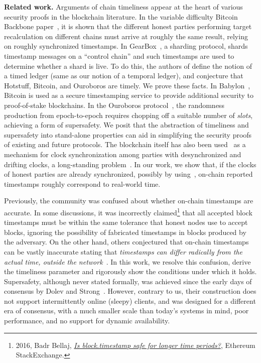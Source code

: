 \noindent
\textbf{Related work.}
Arguments of chain timeliness appear at the heart of various security proofs
in the blockchain literature.
In the variable difficulty Bitcoin Backbone paper~\cite{varbackbone},
it is shown that the different honest parties performing target recalculation on different chains
must arrive at roughly the same result, relying on roughly synchronized timestamps.
In GearBox~\cite{gearbox}, a sharding protocol, shards timestamp messages on a ``control chain'' and such timestamps are used to determine whether a shard is live.
To do this, the authors of \cite{gearbox} define the notion of a timed ledger (same as our notion of a temporal ledger), and conjecture that Hotstuff, Bitcoin, and Ouroboros are timely. We prove these facts.
In Babylon~\cite{babylon}, Bitcoin is used as a secure timestamping service to provide additional security to proof-of-stake blockchains.
In the Ouroboros protocol~\cite{ouroboros},
the randomness production from epoch-to-epoch requires chopping off a suitable number of \emph{slots},
achieving a form of supersafety.
We posit that the abstraction of timeliness and supersafety
into stand-alone properties can aid in simplifying the security proofs
of existing and future protocols.
The blockchain itself has also been used~\cite{klepsydra,chronos}
as a mechanism for clock synchronization among parties with desynchronized and drifting clocks,
a long-standing problem~\cite{lamport-synchronizing-clocks}.
In our work, we show that, if the clocks of honest parties are already synchronized, possibly by using~\cite{klepsydra,chronos},
on-chain reported timestamps roughly correspond to real-world time.

Previously, the community was confused about whether on-chain timestamps are accurate.
In some discussions, it was incorrectly
claimed\footnote{2016, Badr Bellaj, \href{https://ethereum.stackexchange.com/a/9752}{\emph{Is block.timestamp safe for longer time periods?}}, Ethereum StackExchange.} that all accepted block timestamps must be within the same tolerance that honest nodes use to accept blocks, ignoring the possibility of fabricated timestamps in blocks produced by the adversary.
On the other hand, others conjectured that on-chain timestamps can be vastly
inaccurate stating that \emph{timestamps can differ radically from the
actual time, outside the network}~\cite{szalachowski2018short}.
In this work, we resolve this confusion, derive the timeliness parameter and rigorously show the conditions under which it holds.
Supersafety, although never stated formally, was achieved since the early
days of consensus by Dolev and Strong~\cite{dolev-strong}.
However, contrary to us, their construction does not support intermittently online (sleepy) clients,
and was designed for a different era of consensus, with a much smaller scale
than today's systems in mind, poor performance, and no support for dynamic availability.
